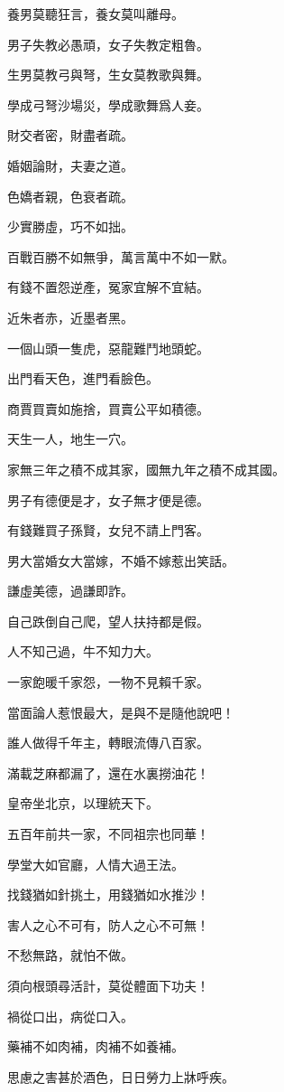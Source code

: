 \documentclass[12pt,a4paper]{ctexbook}
\begin{document}
養男莫聽狂言，養女莫叫離母。\par
男子失教必愚頑，女子失教定粗魯。\par
生男莫教弓與弩，生女莫教歌與舞。\par
學成弓弩沙場災，學成歌舞爲人妾。\par
財交者密，財盡者疏。\par
婚姻論財，夫妻之道。\par
色嬌者親，色衰者疏。\par
少實勝虛，巧不如拙。\par
百戰百勝不如無爭，萬言萬中不如一默。\par
有錢不置怨逆產，冤家宜解不宜結。\par
近朱者赤，近墨者黑。\par
一個山頭一隻虎，惡龍難鬥地頭蛇。\par
出門看天色，進門看臉色。\par
商賈買賣如施捨，買賣公平如積德。\par
天生一人，地生一穴。\par
家無三年之積不成其家，國無九年之積不成其國。\par
男子有德便是才，女子無才便是德。\par
有錢難買子孫賢，女兒不請上門客。\par
男大當婚女大當嫁，不婚不嫁惹出笑話。\par
謙虛美德，過謙即詐。\par
自己跌倒自己爬，望人扶持都是假。\par
人不知己過，牛不知力大。\par
一家飽暖千家怨，一物不見賴千家。\par
當面論人惹恨最大，是與不是隨他說吧！\par
誰人做得千年主，轉眼流傳八百家。\par
滿載芝麻都漏了，還在水裏撈油花！\par
皇帝坐北京，以理統天下。\par
五百年前共一家，不同祖宗也同華！\par
學堂大如官廳，人情大過王法。\par
找錢猶如針挑土，用錢猶如水推沙！\par
害人之心不可有，防人之心不可無！\par
不愁無路，就怕不做。\par
須向根頭尋活計，莫從體面下功夫！\par
禍從口出，病從口入。\par
藥補不如肉補，肉補不如養補。\par
思慮之害甚於酒色，日日勞力上牀呼疾。\par
\end{document}
